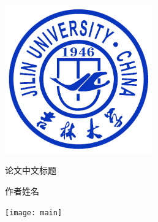 \documentclass[UTF8, zihao = -4]{ctexart}
\newlength{\colpad}
\newcommand{\colwidth}{0.99\ccwd}
\newcommand{\miniwidth}{210mm}
\newcommand{\logowidth}{64mm}
\newcommand{\vertmargin}{\fill}
\begin{document}
\centering
\begin{minipage}[b][\textheight][b]{\miniwidth}
	\vspace*{\fill}\par
	\centerline{\includegraphics[width = \logowidth]{jlu.png}}\par
	\vspace*{\fill}\par
\end{minipage}
\hspace{\colpad}
\begin{minipage}[b][\textheight][b]{\colwidth}
	\bfseries\linespread{1}\selectfont
	\vspace*{\vertmargin}\par
	论文中文标题\par\vfill
	作者姓名\par{}\par	%
	\vspace*{\vertmargin}\par
\end{minipage}
\hspace{\colpad}
\begin{minipage}[b][\textheight][b]{\miniwidth}
	\texttt{[image: main]}
\end{minipage}
\end{document}
